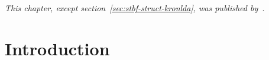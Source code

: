 \label{sec:stbf-struct}
\newcommand{\pv}[1]{
	#1
}

  \emph{This chapter, except section~\ref{sec:stbf-struct-kronlda}, was
  published by~\textcite{VanDenKerchove2022}}.

	\section{Introduction}



